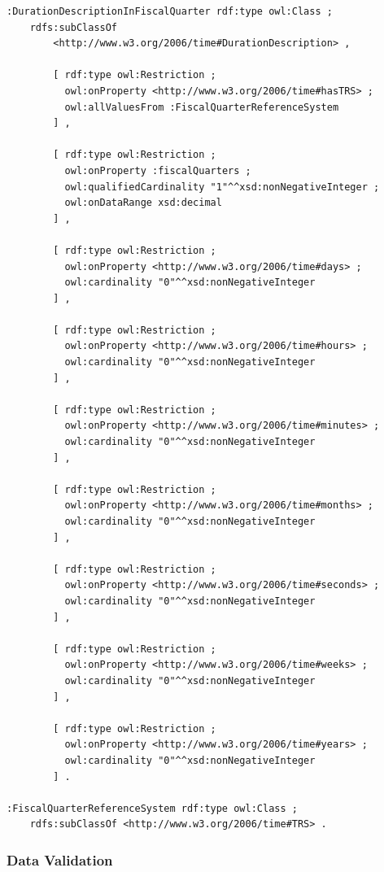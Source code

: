 \begin{verbatim}
:DurationDescriptionInFiscalQuarter rdf:type owl:Class ;
    rdfs:subClassOf 
        <http://www.w3.org/2006/time#DurationDescription> ,
        
        [ rdf:type owl:Restriction ;
          owl:onProperty <http://www.w3.org/2006/time#hasTRS> ;
          owl:allValuesFrom :FiscalQuarterReferenceSystem
        ] ,
        
        [ rdf:type owl:Restriction ;
          owl:onProperty :fiscalQuarters ;
          owl:qualifiedCardinality "1"^^xsd:nonNegativeInteger ;
          owl:onDataRange xsd:decimal
        ] ,
        
        [ rdf:type owl:Restriction ;
          owl:onProperty <http://www.w3.org/2006/time#days> ;
          owl:cardinality "0"^^xsd:nonNegativeInteger
        ] ,
        
        [ rdf:type owl:Restriction ;
          owl:onProperty <http://www.w3.org/2006/time#hours> ;
          owl:cardinality "0"^^xsd:nonNegativeInteger
        ] ,
        
        [ rdf:type owl:Restriction ;
          owl:onProperty <http://www.w3.org/2006/time#minutes> ;
          owl:cardinality "0"^^xsd:nonNegativeInteger
        ] ,
        
        [ rdf:type owl:Restriction ;
          owl:onProperty <http://www.w3.org/2006/time#months> ;
          owl:cardinality "0"^^xsd:nonNegativeInteger
        ] ,
        
        [ rdf:type owl:Restriction ;
          owl:onProperty <http://www.w3.org/2006/time#seconds> ;
          owl:cardinality "0"^^xsd:nonNegativeInteger
        ] ,
        
        [ rdf:type owl:Restriction ;
          owl:onProperty <http://www.w3.org/2006/time#weeks> ;
          owl:cardinality "0"^^xsd:nonNegativeInteger
        ] ,
        
        [ rdf:type owl:Restriction ;
          owl:onProperty <http://www.w3.org/2006/time#years> ;
          owl:cardinality "0"^^xsd:nonNegativeInteger
        ] .

:FiscalQuarterReferenceSystem rdf:type owl:Class ;
    rdfs:subClassOf <http://www.w3.org/2006/time#TRS> .

\end{verbatim}


\subsubsection*{Data Validation}

